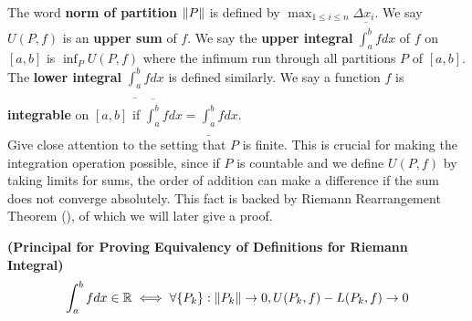 \documentclass{report}
\begin{document}
\begin{mdframed}
The word \textbf{norm of partition} $\| P \|$ is defined by $\max_{1\leq i\leq n} \Delta x_i$. We say $U(P,f)$ is an \textbf{upper sum} of $f$. We say the \textbf{upper integral} $\overline{\int_a^b}fdx$ of $f$ on $[a,b]$ is $\inf_P U(P,f)$ where the infimum run through all partitions $P$ of $[a,b]$. The \textbf{lower integral} $\underline{\int_a^b}fdx$ is defined similarly. We say a function $f$ is \textbf{integrable} on $[a,b]$ if   $\overline{\int_a^b}fdx=\underline{\int_a^b}fdx$.\\

Give close attention to the setting that $P$ is finite. This is crucial for making the integration operation possible, since if  $P$ is countable and we define $U(P,f)$ by taking limits for sums, the order of addition can make a difference if the sum does not converge absolutely. This fact is backed by Riemann Rearrangement Theorem  (), of which we will later give a proof.
\end{mdframed}
\begin{theorem}
\label{1}
\textbf{(Principal for Proving Equivalency of Definitions for Riemann Integral)} 
\begin{align*}
\int_a^b fdx\in\mathbb{R} \iff  \forall \{ P_k \} : \| P_k \|\to 0, U(P_k,f)-L(P_k,f)\to 0
\end{align*}
\end{theorem}
\end{document}
